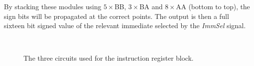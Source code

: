 By stacking these modules using $5\times$BB, $3\times$BA and $8\times$AA (bottom to top), the sign bits will be propagated at the correct points.
The output is then a full sixteen bit signed value of the relevant immediate selected by the \textit{ImmSel} signal.


\begin{figure}
\centering
{}
\\
\caption{The three circuits used for the instruction register block.}
\label{fig:ir:circuit}
\end{figure}

